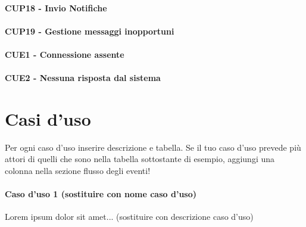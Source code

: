 \paragraph{CUP18 - Invio Notifiche \\}
\paragraph{CUP19 - Gestione messaggi inopportuni\\}
\paragraph{CUE1 - Connessione assente\\}
\paragraph{CUE2 - Nessuna risposta dal sistema \\}


\section{Casi d'uso}
Per ogni caso d'uso inserire descrizione e tabella. Se il tuo caso d'uso prevede più attori di quelli che sono nella tabella sottostante di esempio, aggiungi una colonna nella sezione flusso degli eventi!

\paragraph{Caso d'uso 1 (sostituire con nome caso d'uso) \\} 


Lorem ipsum dolor sit amet... (sostituire con descrizione caso d'uso)

